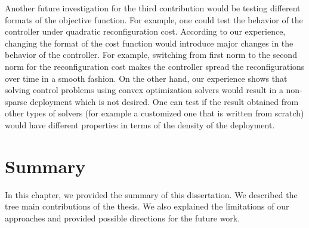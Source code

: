 Another future investigation for the third contribution would be testing different formats of the objective function. For example, one could test the behavior of the controller under quadratic reconfiguration cost. According to our experience, changing the format of the cost function would introduce major changes in the behavior of the controller. For example, switching from first norm to the second norm for the reconfiguration cost makes the controller spread the reconfigurations over time in a smooth fashion. On the other hand, our experience shows that solving control problems using convex optimization solvers would result in a non-sparse deployment which is not desired. One can test if the result obtained from other types of solvers (for example a customized one that is written from scratch) would have different properties in terms of the density of the deployment. 

\section{Summary} 
\label{sec:summary_summary}
 In this chapter, we provided the summary of this dissertation. We described the tree main contributions of the thesis. We also explained the limitations of our approaches and provided possible directions for the future work.

